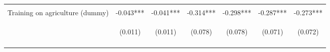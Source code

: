\begin{center}
\begin{tabular}{lcccccc}
\vspace{4pt} & \begin{footnotesize}[0.000]\end{footnotesize} & \begin{footnotesize}[0.000]\end{footnotesize} & \begin{footnotesize}[0.000]\end{footnotesize} & \begin{footnotesize}[0.000]\end{footnotesize} & \begin{footnotesize}[0.000]\end{footnotesize} & \begin{footnotesize}[0.000]\end{footnotesize} \\
Training on agriculture (dummy) & -0.043*** & -0.041*** & -0.314*** & -0.298*** & -0.287*** & -0.273*** \\
 & \begin{footnotesize}(0.011)\end{footnotesize} & \begin{footnotesize}(0.011)\end{footnotesize} & \begin{footnotesize}(0.078)\end{footnotesize} & \begin{footnotesize}(0.078)\end{footnotesize} & \begin{footnotesize}(0.071)\end{footnotesize} & \begin{footnotesize}(0.072)\end{footnotesize} \\
\vspace{4pt} & \begin{footnotesize}[0.000]\end{footnotesize} & \begin{footnotesize}[0.000]\end{footnotesize} & \begin{footnotesize}[0.000]\end{footnotesize} & \begin{footnotesize}[0.000]\end{footnotesize} & \begin{footnotesize}[0.000]\end{footnotesize} & \begin{footnotesize}[0.000]\end{footnotesize} \\

\end{tabular}
\end{center}
